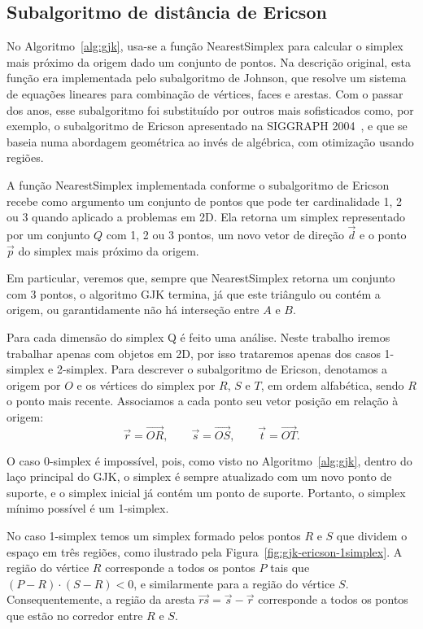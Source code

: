 \subsection*{Subalgoritmo de distância de Ericson}

No Algoritmo~\ref{alg:gjk}, usa-se a função NearestSimplex para calcular o simplex mais próximo da origem dado um conjunto de pontos. Na descrição original, esta função era implementada pelo subalgoritmo de Johnson, que resolve um sistema de equações lineares para combinação de vértices, faces e arestas. 
Com o passar dos anos, esse subalgoritmo foi substituído por outros mais sofisticados como, por exemplo, o subalgoritmo de Ericson apresentado na SIGGRAPH 2004~\cite{ericson2004gjk}, e que se baseia numa abordagem geométrica ao invés de algébrica, com otimização usando regiões. 

A função NearestSimplex implementada conforme o subalgoritmo de Ericson recebe como argumento um conjunto de pontos que pode ter cardinalidade 1, 2 ou 3 quando aplicado a problemas em 2D. Ela retorna um simplex representado por um conjunto $Q$ com 1, 2 ou 3 pontos, um novo vetor de direção $\vec d$ e o ponto $\vec p$ do simplex mais próximo da origem.

Em particular, veremos que, sempre que NearestSimplex retorna um conjunto com 3 pontos, o algoritmo GJK termina, já que este triângulo ou contém a origem, ou garantidamente não há interseção entre $A$ e $B$.

Para cada dimensão do simplex Q é feito uma análise. Neste trabalho iremos trabalhar apenas com objetos em 2D, por isso trataremos apenas dos casos 1-simplex e 2-simplex. Para descrever o subalgoritmo de Ericson, denotamos a origem por $O$ e os vértices do simplex por $R$, $S$ e $T$, em ordem alfabética, sendo $R$ o ponto mais recente. Associamos a cada ponto seu vetor posição em relação à origem:
$$
\vec r = \vec{OR}, \qquad
\vec s = \vec{OS}, \qquad
\vec t = \vec{OT}.
$$

O caso 0-simplex é impossível, pois, como visto no Algoritmo~\ref{alg:gjk}, dentro do laço principal do GJK, o simplex é sempre atualizado com um novo ponto de suporte, e o simplex inicial já contém um ponto de suporte. Portanto, o simplex mínimo possível é um 1-simplex.

No caso 1-simplex temos um simplex formado pelos pontos $R$ e $S$ que dividem o espaço em três regiões, como ilustrado pela Figura~\ref{fig:gjk-ericson-1simplex}.
A região do vértice $R$ corresponde a todos os pontos $P$ tais que $(P-R) \cdot (S-R) < 0$, e similarmente para a região do vértice $S$. Consequentemente, a região da aresta $\vec{rs} = \vec s - \vec r$ corresponde a todos os pontos que estão no corredor entre $R$ e $S$.


